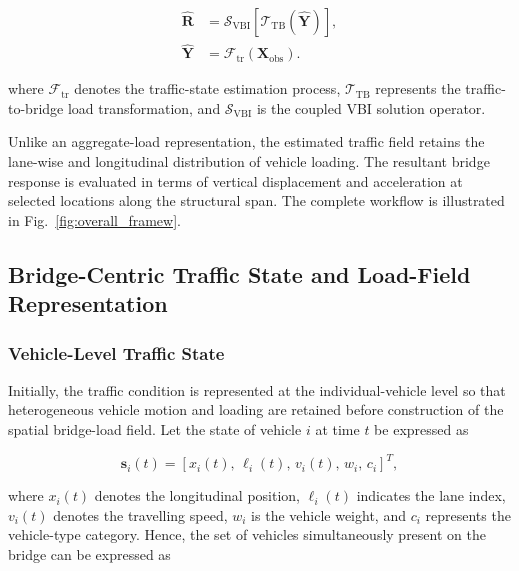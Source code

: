 \documentclass[journal]{IEEEtran}
\begin{document}
\begin{equation}
\begin{aligned}
\widehat{\mathbf{R}}
&=
\mathcal{S}_{\mathrm{VBI}}
\left[
\mathcal{T}_{\mathrm{TB}}
\left(
\widehat{\mathbf{Y}}
\right)
\right],
\\
\widehat{\mathbf{Y}}
&=
\mathcal{F}_{\mathrm{tr}}
\left(
\mathbf{X}_{\mathrm{obs}}
\right).
\end{aligned}
\label{eq:overall_framework}
\end{equation}

where $\mathcal{F}_{\mathrm{tr}}$ denotes the traffic-state estimation process, $\mathcal{T}_{\mathrm{TB}}$ represents the traffic-to-bridge load transformation, and $\mathcal{S}_{\mathrm{VBI}}$ is the coupled VBI solution operator.

Unlike an aggregate-load representation, the estimated traffic field retains the lane-wise and longitudinal distribution of vehicle loading. The resultant bridge response is evaluated in terms of vertical displacement and acceleration at selected locations along the structural span. The complete workflow is illustrated in Fig.~\ref{fig:overall_framew}.

\subsection{Bridge-Centric Traffic State and Load-Field Representation}
\label{sec:traffic_state_representation}

\subsubsection{Vehicle-Level Traffic State}
\label{subsec:vehicle_state}

Initially, the traffic condition is represented at the individual-vehicle level so that heterogeneous vehicle motion and loading are retained before construction of the spatial bridge-load field. Let the state of vehicle $i$ at time $t$ be expressed as

\begin{equation}
\mathbf{s}_{i}(t)
=
\left[
x_i(t),\,
\ell_i(t),\,
v_i(t),\,
w_i,\,
c_i
\right]^{T},
\label{eq:vehicle_state}
\end{equation}

where $x_i(t)$ denotes the longitudinal position, $\ell_i(t)$ indicates the lane index, $v_i(t)$ denotes the travelling speed, $w_i$ is the vehicle weight, and $c_i$ represents the vehicle-type category. Hence, the set of vehicles simultaneously present on the bridge can be expressed as
\end{document}
